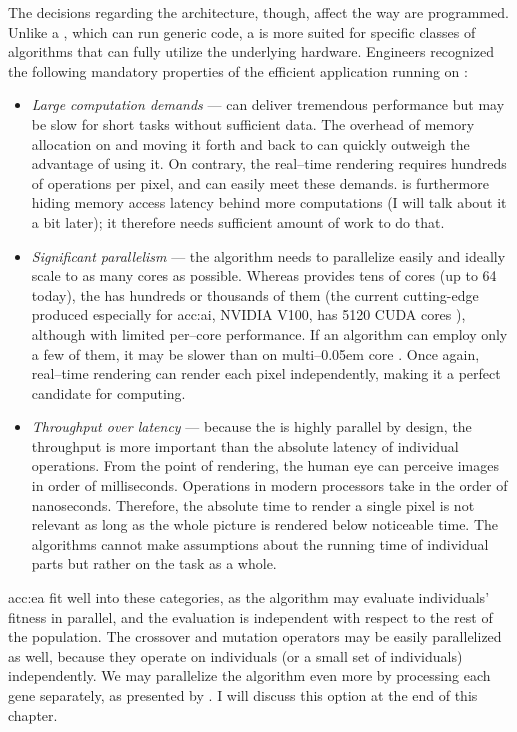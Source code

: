The decisions regarding the architecture, though, affect the way  are programmed. Unlike a \cpuns, which can run generic code, a \gpu is more suited for specific classes of algorithms that can fully utilize the underlying hardware. Engineers recognized the following mandatory properties of the efficient application running on \gpu \citep{GPUComputingOwens}:
\begin{itemize}
    \item \textit{Large computation demands} --- \gpu can deliver tremendous performance but may be slow for short tasks without sufficient data. The overhead of memory allocation on \gpu and moving it forth and back to \cpu can quickly outweigh the advantage of using it. On contrary, the real--time rendering requires hundreds of operations per pixel, and \gpu can easily meet these demands. \gpu is furthermore hiding memory access latency behind more computations (I will talk about it a bit later); it therefore needs sufficient amount of work to do that.
    \item \textit{Significant parallelism} --- the algorithm needs to parallelize easily and ideally scale to as many cores as possible. Whereas \cpu provides tens of cores (up to 64 today), the \gpu has hundreds or thousands of them (the current cutting-edge \gpu produced especially for \acrshort{acc:ai}, NVIDIA V100, has 5120 CUDA cores \citep{nvidiav100spec}), although with limited per--core performance. If an algorithm can employ only a few of them, it may be slower than on multi--\kern0.05em core \cpuns. Once again, real--time rendering can render each pixel independently, making it a perfect candidate for \gpu computing.
    \item \textit{Throughput over latency} --- because the \gpu is highly parallel by design, the throughput is more important than the absolute latency of individual operations. From the point of rendering, the human eye can perceive images in order of milliseconds. Operations in modern processors take in the order of nanoseconds. Therefore, the absolute time to render a single pixel is not relevant as long as the whole picture is rendered below noticeable time. The algorithms cannot make assumptions about the running time of individual parts but rather on the task as a whole.
\end{itemize}

\acrlong{acc:ea} fit well into these categories, as the algorithm may evaluate individuals' fitness in parallel, and the evaluation is independent with respect to the rest of the population. The crossover and mutation operators may be easily parallelized as well, because they operate on individuals (or a small set of individuals) independently. We may parallelize the algorithm even more by processing each gene separately, as presented by \citet{CHENG2019514}. I will discuss this option at the end of this chapter.




